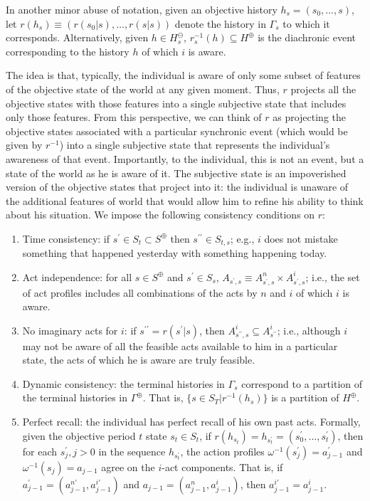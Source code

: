 \documentclass[
11pt,
titlepage,
reqno,
]{article}%
\theoremstyle{definition}
\begin{document}
In another minor abuse of notation, given an objective history $h_s=(s_0,\ldots,s)$, let $r(h_s)\equiv(r(s_0|s),\ldots,r(s|s))$ denote the history in $\Gamma_s$ to which it corresponds.
Alternatively, given $h\in H^\ominus_s$, $r^{-1}_s(h)\subseteq H^\oplus$ is the diachronic event corresponding to the history $h$ of which $i$ is aware.

The idea is that, typically, the individual is aware of only some subset of features of the objective state of the world at any given moment.
Thus, $r$ projects all the objective states with those features into a single subjective state that includes only those features.
From this perspective, we can think of $r$ as projecting the objective states associated with a particular synchronic event (which would be given by $r^{-1}$) into a single subjective state that represents the individual's awareness of that event.
Importantly, to the individual, this is not an event, but a state of the world as he is aware of it.
The subjective state is an impoverished version of the objective states that project into it: the individual is unaware of the additional features of world that would allow him to refine his ability to think about his situation. 
We impose the following consistency conditions on $r$:
\begin{enumerate}
	\item Time consistency: if $s^\prime\in S_t\subset S^\oplus$ then $s^{\prime\prime}\in S_{t,s}$; e.g., $i$ does not mistake something that happened yesterday with something happening today.
	\item Act independence: for all $s\in S^\oplus$ and $s^\prime\in S_s$, $A_{s^\prime,s}\equiv A^n_{s^\prime,s}\times A^i_{s^\prime,s}$; i.e., the set of act profiles includes all combinations of the acts by $n$ and $i$ of which $i$ is aware.
	\item No imaginary acts for $i$: if $s^{\prime\prime}=r(s^\prime|s)$, then $A^i_{s^{\prime\prime},s}\subseteq A^i_{s^{\prime\prime}}$; i.e., although $i$ may not be aware of all the feasible acts available to him in a particular state, the acts of which he is aware are truly feasible.
	\item Dynamic consistency: the terminal histories in $\Gamma_s$ correspond to a partition of the terminal histories in $\Gamma^\oplus$. That is, $\{s\in S_T|r^{-1}(h_s)\}$ is a partition of $H^\oplus$.
	\item Perfect recall: the individual has perfect recall of his own past acts. Formally, given the objective period $t$ state  $s_t\in S_t$, if $r(h_{s_t})=h_{s^\prime_t}=(s^\prime_0,\ldots,s^\prime_t)$, then for each $s^\prime_j,j>0$ in the sequence $h_{s^\prime_t}$, the action profiles $\omega^{-1}(s^\prime_j)=a^\prime_{j-1}$ and $\omega^{-1}(s_j)=a_{j-1}$ agree on the $i$-act components. That is, if $a^\prime_{j-1}=(a^{n\prime}_{j-1},a^{i\prime}_{j-1})$ and $a_{j-1}=(a^n_{j-1},a^i_{j-1})$, then $a^{i\prime}_{j-1}=a^i_{j-1}$.
\end{enumerate}
\end{document}
